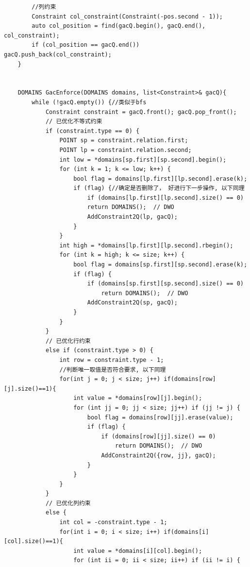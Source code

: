 \documentclass{article}
\begin{document}
\begin{lstlisting}
        //列约束
        Constraint col_constraint(Constraint(-pos.second - 1));
        auto col_position = find(gacQ.begin(), gacQ.end(), col_constraint);
        if (col_position == gacQ.end()) gacQ.push_back(col_constraint);
    } 
    
    
    DOMAINS GacEnforce(DOMAINS domains, list<Constraint>& gacQ){
        while (!gacQ.empty()) {//类似于bfs
            Constraint constraint = gacQ.front(); gacQ.pop_front();
            // 已优化不等式约束
            if (constraint.type == 0) {
                POINT sp = constraint.relation.first;
                POINT lp = constraint.relation.second;
                int low = *domains[sp.first][sp.second].begin();
                for (int k = 1; k <= low; k++) {
                    bool flag = domains[lp.first][lp.second].erase(k);
                    if (flag) {//确定是否删除了， 好进行下一步操作, 以下同理
                        if (domains[lp.first][lp.second].size() == 0) 
                        return DOMAINS();  // DWO
                        AddConstraint2Q(lp, gacQ);
                    }
                }
                int high = *domains[lp.first][lp.second].rbegin();
                for (int k = high; k <= size; k++) {
                    bool flag = domains[sp.first][sp.second].erase(k);
                    if (flag) {
                        if (domains[sp.first][sp.second].size() == 0) 
                        	return DOMAINS();  // DWO
                        AddConstraint2Q(sp, gacQ);
                    }
                }
            }
            // 已优化行约束
            else if (constraint.type > 0) {
                int row = constraint.type - 1;
                //判断唯一取值是否符合要求, 以下同理
                for(int j = 0; j < size; j++) if(domains[row][j].size()==1){
                    int value = *domains[row][j].begin();
                    for (int jj = 0; jj < size; jj++) if (jj != j) {
                        bool flag = domains[row][jj].erase(value);
                        if (flag) {
                            if (domains[row][jj].size() == 0) 
                            	return DOMAINS();  // DWO
                            AddConstraint2Q({row, jj}, gacQ);
                        }
                    }
                }
            }
            // 已优化列约束
            else {
                int col = -constraint.type - 1;
                for(int i = 0; i < size; i++) if(domains[i][col].size()==1){
                    int value = *domains[i][col].begin();
                    for (int ii = 0; ii < size; ii++) if (ii != i) {

\end{lstlisting}
\end{document}
